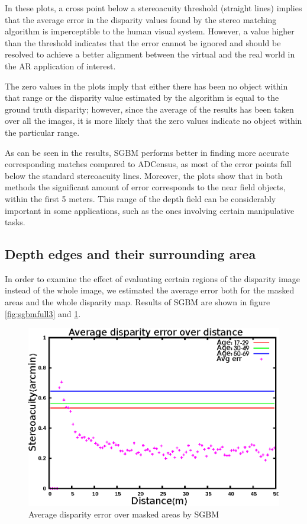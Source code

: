 In these plots, a cross point below a stereoacuity threshold (straight lines) implies that the average error in the disparity values found by the stereo matching 
algorithm is imperceptible to the human visual system. However, a value higher than the threshold indicates that
the error cannot be ignored and should be resolved to achieve a better alignment between the virtual and the 
real world in the AR application of interest.

The zero values in the plots imply that either there has been no object within that range or the disparity value estimated by the algorithm
is equal to the ground truth disparity; however, since the average of the results has been taken over all the images, it is more likely that 
the zero values indicate no object within the particular range.

As can be seen in the results, SGBM performs better in finding more accurate corresponding matches 
compared to ADCensus, as most of the error points fall below the standard stereoacuity lines. Moreover, the plots show that in both methods 
the significant amount of error
corresponds to the near field objects, within the first 5 meters. This range of the depth field can be considerably important in some applications,
such as the ones involving certain manipulative tasks.

\subsection{Depth edges and their surrounding area}
In order to examine the effect of evaluating certain regions of the disparity image instead of the whole image, 
we estimated the average error both for the masked areas and the whole disparity map. 
Results of SGBM are shown in figure \ref{fig:sgbmfull3} and \ref{fig:sgbmmsk3}.

\begin{figure}[H]
\centering
\includegraphics[scale=0.8]{sgbmmsk3}
\caption{Average disparity error over masked areas by SGBM}
\label{fig:sgbmmsk3}
\end{figure} 

